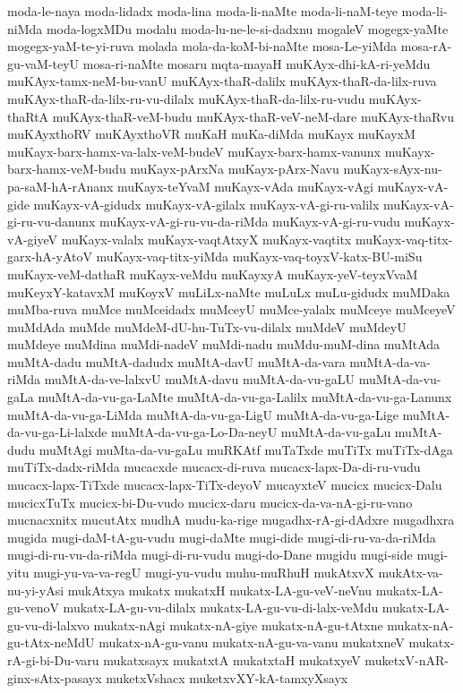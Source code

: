 {moda-le-naya
moda-lidadx
moda-lina
moda-li-naMte
moda-li-naM-teye
moda-li-niMda
moda-logxMDu
modalu
moda-lu-ne-le-si-dadxnu
mogaleV
mogegx-yaMte
mogegx-yaM-te-yi-ruva
molada
mola-da-koM-bi-naMte
mosa-Le-yiMda
mosa-rA-gu-vaM-teyU
mosa-ri-naMte
mosaru
mqta-mayaH
muKAyx-dhi-kA-ri-yeMdu
muKAyx-tamx-neM-bu-vanU
muKAyx-thaR-dalilx
muKAyx-thaR-da-lilx-ruva
muKAyx-thaR-da-lilx-ru-vu-dilalx
muKAyx-thaR-da-lilx-ru-vudu
muKAyx-thaRtA
muKAyx-thaR-veM-budu
muKAyx-thaR-veV-neM-dare
muKAyx-thaRvu
muKAyxthoRV
muKAyxthoVR
muKaH
muKa-diMda
muKayx
muKayxM
muKayx-barx-hamx-va-lalx-veM-budeV
muKayx-barx-hamx-vanunx
muKayx-barx-hamx-veM-budu
muKayx-pArxNa
muKayx-pArx-Navu
muKayx-sAyx-nu-pa-saM-hA-rAnanx
muKayx-teYvaM
muKayx-vAda
muKayx-vAgi
muKayx-vA-gide
muKayx-vA-gidudx
muKayx-vA-gilalx
muKayx-vA-gi-ru-valilx
muKayx-vA-gi-ru-vu-danunx
muKayx-vA-gi-ru-vu-da-riMda
muKayx-vA-gi-ru-vudu
muKayx-vA-giyeV
muKayx-valalx
muKayx-vaqtAtxyX
muKayx-vaqtitx
muKayx-vaq-titx-garx-hA-yAtoV
muKayx-vaq-titx-yiMda
muKayx-vaq-toyxV-katx-BU-miSu
muKayx-veM-dathaR
muKayx-veMdu
muKayxyA
muKayx-yeV-teyxVvaM
muKeyxY-katavxM
muKoyxV
muLiLx-naMte
muLuLx
muLu-gidudx
muMDaka
muMba-ruva
muMce
muMceidadx
muMceyU
muMce-yalalx
muMceye
muMceyeV
muMdAda
muMde
muMdeM-dU-hu-TuTx-vu-dilalx
muMdeV
muMdeyU
muMdeye
muMdina
muMdi-nadeV
muMdi-nadu
muMdu-muM-dina
muMtAda
muMtA-dadu
muMtA-dadudx
muMtA-davU
muMtA-da-vara
muMtA-da-va-riMda
muMtA-da-ve-lalxvU
muMtA-davu
muMtA-da-vu-gaLU
muMtA-da-vu-gaLa
muMtA-da-vu-ga-LaMte
muMtA-da-vu-ga-Lalilx
muMtA-da-vu-ga-Lanunx
muMtA-da-vu-ga-LiMda
muMtA-da-vu-ga-LigU
muMtA-da-vu-ga-Lige
muMtA-da-vu-ga-Li-lalxde
muMtA-da-vu-ga-Lo-Da-neyU
muMtA-da-vu-gaLu
muMtA-dudu
muMtAgi
muMta-da-vu-gaLu
muRKAtf
muTaTxde
muTiTx
muTiTx-dAga
muTiTx-dadx-riMda
mucacxde
mucacx-di-ruva
mucacx-lapx-Da-di-ru-vudu
mucacx-lapx-TiTxde
mucacx-lapx-TiTx-deyoV
mucayxteV
mucicx
mucicx-Dalu
mucicxTuTx
mucicx-bi-Du-vudo
mucicx-daru
mucicx-da-va-nA-gi-ru-vano
mucnacxnitx
mucutAtx
mudhA
mudu-ka-rige
mugadhx-rA-gi-dAdxre
mugadhxra
mugida
mugi-daM-tA-gu-vudu
mugi-daMte
mugi-dide
mugi-di-ru-va-da-riMda
mugi-di-ru-vu-da-riMda
mugi-di-ru-vudu
mugi-do-Dane
mugidu
mugi-side
mugi-yitu
mugi-yu-va-va-regU
mugi-yu-vudu
muhu-muRhuH
mukAtxvX
mukAtx-va-nu-yi-yAsi
mukAtxya
mukatx
mukatxH
mukatx-LA-gu-veV-neVnu
mukatx-LA-gu-venoV
mukatx-LA-gu-vu-dilalx
mukatx-LA-gu-vu-di-lalx-veMdu
mukatx-LA-gu-vu-di-lalxvo
mukatx-nAgi
mukatx-nA-giye
mukatx-nA-gu-tAtxne
mukatx-nA-gu-tAtx-neMdU
mukatx-nA-gu-vanu
mukatx-nA-gu-va-vanu
mukatxneV
mukatx-rA-gi-bi-Du-varu
mukatxsayx
mukatxtA
mukatxtaH
mukatxyeV
muketxV-nAR-ginx-sAtx-pasayx
muketxVshacx
muketxvXY-kA-tamxyXsayx
}
